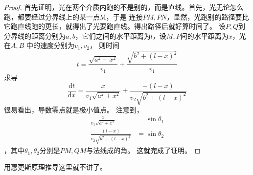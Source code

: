 \begin{proof}
首先证明，光在两个介质内跑的不是别的，而是直线。首先，光无论怎么跑，都要经过分界线上的某一点M，于是
连接$PM,PN$，显然，光跑别的路径要比它跑直线跑的更长，就得出了光要跑直线。得出路径后就好算时间了。
设$P,Q$到分界线的距离分别为$a,b$，它们之间的水平距离为$l$，设$M,P$间的水平距离为$x$，光在$A,B$
中的速度分别为$v_1,v_2$，
则时间
\begin{equation}
t = \frac{\sqrt{a^2 + x^2}}{v_1} + \frac{\sqrt{b^2 + (l-x)^2}}{v_1}
\end{equation}
求导
\begin{equation}
\frac{\mathrm{d}t}{\mathrm{d}x} = \frac{x}{v_1\sqrt{a^2 + x^2}} + 
\frac{-(l-x)}{v_2\sqrt{b^2 + (l-x)^2}}
\end{equation}
很易看出，导数零点就是极小值点。
注意到，
\begin{align*}
\frac{x}{v_1\sqrt{a^2 + x^2}} &= \sin{\theta_1} \\
\frac{(l-x)}{v_2\sqrt{b^2 + (l-x)^2}} &= \sin{\theta_2}
\end{align*}
，其中$\theta_1,\theta_2$分别是$PM,QM$与法线成的角。
这就完成了证明。
\end{proof}

用惠更斯原理推导这里就不讲了。